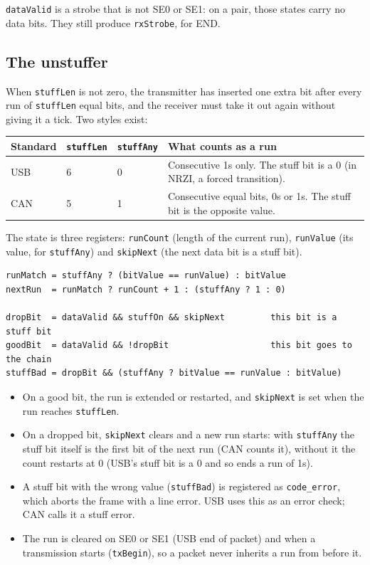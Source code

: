 \documentclass[11pt,a4paper]{article}
\newcommand{\sig}[1]{\texttt{#1}}
\begin{document}
\sig{dataValid} is a strobe that is not SE0 or SE1: on a pair, those states carry no data bits. They still produce \sig{rxStrobe}, for END.

\subsection{The unstuffer}

When \sig{stuffLen} is not zero, the transmitter has inserted one extra bit after every run of \sig{stuffLen} equal bits, and the receiver must take it out again without giving it a tick. Two styles exist:

\begin{center}
\begin{tabularx}{\linewidth}{@{}l l l L@{}}
\toprule
Standard & \sig{stuffLen} & \sig{stuffAny} & What counts as a run \\
\midrule
USB & 6 & 0 & Consecutive 1s only. The stuff bit is a 0 (in NRZI, a forced transition). \\
CAN & 5 & 1 & Consecutive equal bits, 0s or 1s. The stuff bit is the opposite value. \\
\bottomrule
\end{tabularx}
\end{center}

The state is three registers: \sig{runCount} (length of the current run), \sig{runValue} (its value, for \sig{stuffAny}) and \sig{skipNext} (the next data bit is a stuff bit).

\begin{lstlisting}
runMatch = stuffAny ? (bitValue == runValue) : bitValue
nextRun  = runMatch ? runCount + 1 : (stuffAny ? 1 : 0)

dropBit  = dataValid && stuffOn && skipNext         this bit is a stuff bit
goodBit  = dataValid && !dropBit                    this bit goes to the chain
stuffBad = dropBit && (stuffAny ? bitValue == runValue : bitValue)
\end{lstlisting}

\begin{itemize}
\item On a good bit, the run is extended or restarted, and \sig{skipNext} is set when the run reaches \sig{stuffLen}.
\item On a dropped bit, \sig{skipNext} clears and a new run starts: with \sig{stuffAny} the stuff bit itself is the first bit of the next run (CAN counts it), without it the count restarts at 0 (USB's stuff bit is a 0 and so ends a run of 1s).
\item A stuff bit with the wrong value (\sig{stuffBad}) is registered as \sig{code\_error}, which aborts the frame with a line error. USB uses this as an error check; CAN calls it a stuff error.
\item The run is cleared on SE0 or SE1 (USB end of packet) and when a transmission starts (\sig{txBegin}), so a packet never inherits a run from before it.
\end{itemize}
\end{document}
